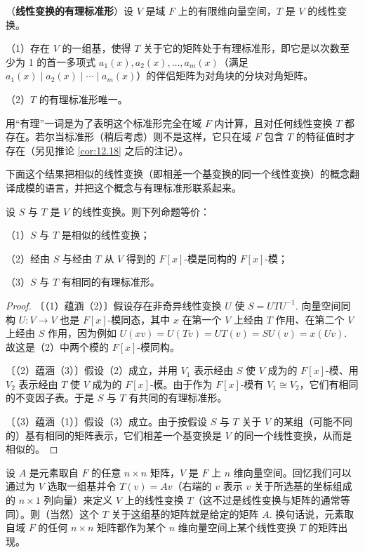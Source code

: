 \begin{theorem}\label{thm:12.14}
（\textbf{线性变换的有理标准形}）设 \(V\) 是域 \(F\) 上的有限维向量空间，\(T\) 是 \(V\) 的线性变换。

（1）存在 \(V\) 的一组基，使得 \(T\) 关于它的矩阵处于有理标准形，即它是以次数至少为 1 的首一多项式 \(a_1(x), a_2(x), \ldots, a_m(x)\)（满足 \(a_1(x) \mid a_2(x) \mid \cdots \mid a_m(x)\)）的伴侣矩阵为对角块的分块对角矩阵。

（2）\(T\) 的有理标准形唯一。
\end{theorem}

用“有理”一词是为了表明这个标准形完全在域 \(F\) 内计算，且对任何线性变换 \(T\) 都存在。若尔当标准形（稍后考虑）则不是这样，它只在域 \(F\) 包含 \(T\) 的特征值时才存在（另见推论 \ref{cor:12.18} 之后的注记）。

下面这个结果把相似的线性变换（即相差一个基变换的同一个线性变换）的概念翻译成模的语言，并把这个概念与有理标准形联系起来。

\begin{theorem}\label{thm:12.15}
设 \(S\) 与 \(T\) 是 \(V\) 的线性变换。则下列命题等价：

（1）\(S\) 与 \(T\) 是相似的线性变换；

（2）经由 \(S\) 与经由 \(T\) 从 \(V\) 得到的 \(F[x]\)-模是同构的 \(F[x]\)-模；

（3）\(S\) 与 \(T\) 有相同的有理标准形。
\end{theorem}

\begin{proof}
〔（1）蕴涵（2）〕假设存在非奇异线性变换 \(U\) 使 \(S = UTU^{-1}\). 向量空间同构 \(U : V \to V\) 也是 \(F[x]\)-模同态，其中 \(x\) 在第一个 \(V\) 上经由 \(T\) 作用、在第二个 \(V\) 上经由 \(S\) 作用，因为例如 \(U(xv) = U(Tv) = UT(v) = SU(v) = x(Uv)\). 故这是（2）中两个模的 \(F[x]\)-模同构。

〔（2）蕴涵（3）〕假设（2）成立，并用 \(V_1\) 表示经由 \(S\) 使 \(V\) 成为的 \(F[x]\)-模、用 \(V_2\) 表示经由 \(T\) 使 \(V\) 成为的 \(F[x]\)-模。由于作为 \(F[x]\)-模有 \(V_1 \cong V_2\)，它们有相同的不变因子表。于是 \(S\) 与 \(T\) 有共同的有理标准形。

〔（3）蕴涵（1）〕假设（3）成立。由于按假设 \(S\) 与 \(T\) 关于 \(V\) 的某组（可能不同的）基有相同的矩阵表示，它们相差一个基变换是 \(V\) 的同一个线性变换，从而是相似的。
\end{proof}

设 \(A\) 是元素取自 \(F\) 的任意 \(n \times n\) 矩阵，\(V\) 是 \(F\) 上 \(n\) 维向量空间。回忆我们可以通过为 \(V\) 选取一组基并令 \(T(v) = Av\)（右端的 \(v\) 表示 \(v\) 关于所选基的坐标组成的 \(n \times 1\) 列向量）来定义 \(V\) 上的线性变换 \(T\)（这不过是线性变换与矩阵的通常等同）。则（当然）这个 \(T\) 关于这组基的矩阵就是给定的矩阵 \(A\). 换句话说，元素取自域 \(F\) 的任何 \(n \times n\) 矩阵都作为某个 \(n\) 维向量空间上某个线性变换 \(T\) 的矩阵出现。

